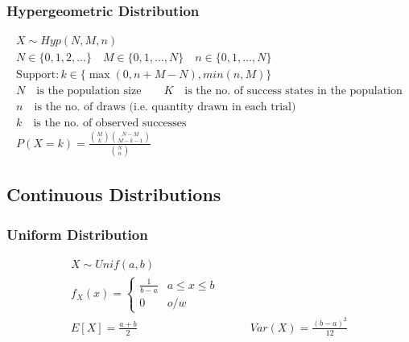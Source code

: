 \subsubsection*{Hypergeometric Distribution}
\begin{tcolorbox}
	\begin{gather*}
		X \sim Hyp(N, M, n)\\
		N \in \{0, 1, 2, \ldots \} \quad M \in \{0, 1, \ldots, N\} \quad n \in \{0, 1, \ldots, N\}\\
		\text{Support}: k \in \{\max(0, n + M - N), min(n, M)\}\\
		N \quad \text{is the population size}\qquad
		K \quad\text{is the no. of success states in the population}\\
		n \quad\text{is the no. of draws (i.e. quantity drawn in each trial)}\\
		k \quad\text{is the no. of observed successes}\\
		P(X = k) = \frac{\binom{M}{k} \binom{N - M}{M - k - 1}}{\binom{N}{n}}
	\end{gather*}
\end{tcolorbox}
\subsection*{Continuous Distributions}
\subsubsection*{Uniform Distribution}
\begin{tcolorbox}
	\begin{gather*}
		X \sim Unif(a,b)\\
		f_X(x) = 
		\begin{cases}
			\frac{1}{b-a} & a \leq x \leq b\\
			0 & o/w
		\end{cases}\\
		E[X] = \frac{a + b}{2} \hspace{10em} Var(X) = \frac{(b-a)^2}{12}
	\end{gather*}
\end{tcolorbox}
